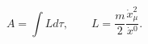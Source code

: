 \begin{equation}
A=\int Ld\tau,\qquad
L=\frac{m}{2}\frac{\dot{x}_\mu^2}{\dot{x}{}^0}.
\label{l2}
\end{equation}

